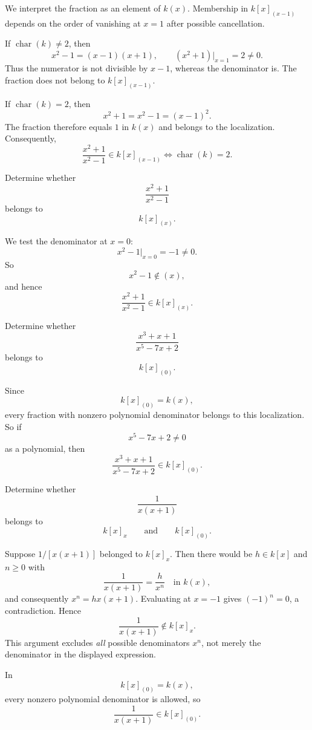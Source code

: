 \begin{solution}
We interpret the fraction as an element of $k(x)$. Membership in
$k[x]_{(x-1)}$ depends on the order of vanishing at $x=1$
after possible cancellation.

If $\operatorname{char}(k)\ne 2$, then
\[
x^2-1=(x-1)(x+1),
\qquad (x^2+1)\big|_{x=1}=2\ne 0.
\]
Thus the numerator is not divisible by $x-1$, whereas the denominator
is. The fraction does not belong to $k[x]_{(x-1)}$.

If $\operatorname{char}(k)=2$, then
\[
x^2+1=x^2-1=(x-1)^2.
\]
The fraction therefore equals $1$ in $k(x)$ and belongs to the
localization. Consequently,
\[
\boxed{
\frac{x^2+1}{x^2-1}\in k[x]_{(x-1)}
\iff \operatorname{char}(k)=2.
}
\]
\end{solution}


\begin{problem}[CP-V-0063]
\label{prob:cp-v-0063}
Determine whether
\[
\frac{x^2+1}{x^2-1}
\]
belongs to
\[
k[x]_{(x)}.
\]
\end{problem}

\begin{solution}
We test the denominator at \(x=0\):
\[
x^2-1\big|_{x=0}=-1\neq 0.
\]
So
\[
x^2-1\notin (x),
\]
and hence
\[
\frac{x^2+1}{x^2-1}\in k[x]_{(x)}.
\]
\end{solution}


\begin{problem}[CP-V-0064]
\label{prob:cp-v-0064}
Determine whether
\[
\frac{x^3+x+1}{x^5-7x+2}
\]
belongs to
\[
k[x]_{(0)}.
\]
\end{problem}

\begin{solution}
Since
\[
k[x]_{(0)}=k(x),
\]
every fraction with nonzero polynomial denominator belongs to this localization. So if
\[
x^5-7x+2\neq 0
\]
as a polynomial, then
\[
\frac{x^3+x+1}{x^5-7x+2}\in k[x]_{(0)}.
\]
\end{solution}


\begin{problem}[CP-V-0065]
\label{prob:cp-v-0065}
Determine whether
\[
\frac{1}{x(x+1)}
\]
belongs to
\[
k[x]_x
\qquad\text{and}\qquad
k[x]_{(0)}.
\]
\end{problem}

\begin{solution}
Suppose \(1/[x(x+1)]\) belonged to \(k[x]_x\). Then there
would be \(h\in k[x]\) and \(n\ge0\) with
\[
\frac{1}{x(x+1)}=\frac{h}{x^n}
\quad\text{in }k(x),
\]
and consequently \(x^n=hx(x+1)\). Evaluating at \(x=-1\)
gives \((-1)^n=0\), a contradiction. Hence
\[
\frac{1}{x(x+1)}\notin k[x]_x.
\]
This argument excludes \emph{all} possible denominators \(x^n\),
not merely the denominator in the displayed expression.

In
\[
k[x]_{(0)}=k(x),
\]
every nonzero polynomial denominator is allowed, so
\[
\frac{1}{x(x+1)}\in k[x]_{(0)}.
\]
\end{solution}


